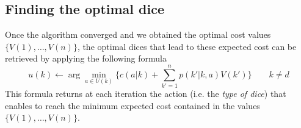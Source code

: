 
\subsection{Finding the optimal dice} %
\label{sub:choosing_the_optimal_dice}
Once the algorithm converged and we obtained the optimal 
cost values $\{V(1), \dots, V(n)\}$, the optimal dices that
lead to these expected cost can be retrieved by applying
the following formula
\[
  u(k) \leftarrow \arg\min_{a\in U(k)} \{c(a|k) 
  + \sum_{k'=1}^n p(k'|k,a)V(k') \} \qquad k \neq d
\]
This formula returns at each iteration the action
(i.e. the \emph{type of dice}) that enables to reach the minimum
expected cost contained in the values $\{V(1), \dots, V(n)\}$.


